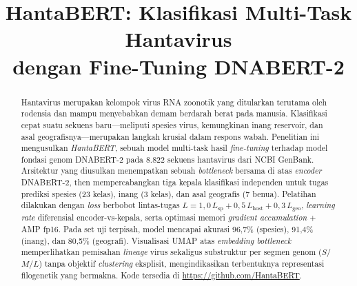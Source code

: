 \documentclass[conference]{IEEEtran}
\begin{document}
\title{HantaBERT: Klasifikasi Multi-Task Hantavirus\\dengan Fine-Tuning DNABERT-2}

\author{%
}

\maketitle

\begin{abstract}
Hantavirus merupakan kelompok virus RNA zoonotik yang ditularkan terutama
oleh rodensia dan mampu menyebabkan demam berdarah berat pada manusia.
Klasifikasi cepat suatu sekuens baru---meliputi spesies virus, kemungkinan
inang reservoir, dan asal geografisnya---merupakan langkah krusial dalam
respons wabah. Penelitian ini mengusulkan \emph{HantaBERT}, sebuah model
multi-task hasil \emph{fine-tuning} terhadap model fondasi genom
\textsc{DNABERT-2} pada 8.822 sekuens hantavirus dari NCBI GenBank.
Arsitektur yang diusulkan menempatkan sebuah \emph{bottleneck} bersama di
atas \emph{encoder} DNABERT-2, then mempercabangkan tiga kepala
klasifikasi independen untuk tugas prediksi spesies (23 kelas), inang
(3 kelas), dan asal geografis (7 benua). Pelatihan dilakukan dengan
\emph{loss} berbobot lintas-tugas $L = 1{,}0\,L_{\text{sp}} + 0{,}5\,L_{\text{host}}
+ 0{,}3\,L_{\text{geo}}$, \emph{learning rate} diferensial encoder-vs-kepala,
serta optimasi memori \emph{gradient accumulation} + AMP fp16. Pada set uji
terpisah, model mencapai akurasi 96{,}7\% (spesies), 91{,}4\% (inang), dan
80{,}5\% (geografi). Visualisasi UMAP atas \emph{embedding bottleneck}
memperlihatkan pemisahan \emph{lineage} virus sekaligus substruktur per
segmen genom ($S$/$M$/$L$) tanpa objektif \emph{clustering} eksplisit,
mengindikasikan terbentuknya representasi filogenetik yang bermakna.
Kode tersedia di \url{https://github.com/HantaBERT}.
\end{abstract}
\end{document}
